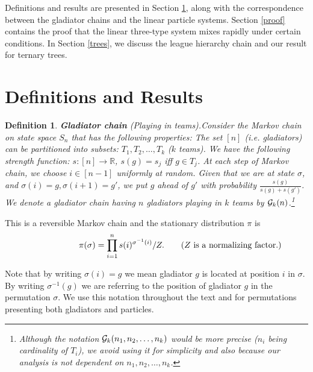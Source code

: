\documentclass[10 pt]{article}
\newcommand{\G}{{\cal G}}
\newcommand{\R}{\mathbb{R}}
\newtheorem{defin}{Definition}[section]
\begin{document}
\medskip
Definitions and results are presented in Section \ref{Section1}, along with the correspondence between the gladiator chains and the
linear particle systems. Section \ref{proof} contains the proof that the linear three-type system mixes rapidly under certain conditions.
In Section \ref{trees}, we discuss the league hierarchy chain and our result for ternary trees.  

\section{Definitions and Results}\label{Section1}



\begin{defin}\textbf{Gladiator chain} (Playing in teams).\label{defteams}
Consider the Markov chain  on state space $S_n$ that has the following properties: The set  $[n]$ (i.e. gladiators)  can be  partitioned
into subsets: $T_1 , T_2, \dots , T_k $ ($k$ teams). We have the following strength function: $s:[n]\rightarrow \R$, $s(g)=s_j$ iff $g\in T_j$.
At each step of Markov chain,  we choose $i\in [n{-}1]$ uniformly at random. Given that we are at state $\sigma$, and $\sigma(i)=g,
\sigma(i{+}1)=g'$, we put $g$ ahead of $g'$ with probability $\frac{s(g)}{s(g)+s(g')}$.  We denote a gladiator chain having $n$ gladiators
playing in $k$ teams by ${\G}_k(n)$.\footnote{Although the notation $\G_k(n_1,n_2,\dots,n_k)$ would be more precise ($n_i$ being cardinality
of $T_i$), we avoid using it for simplicity and also because our analysis is not dependent on $n_1, n_2, \dots, n_k$.}

\end{defin}


This is a reversible Markov chain and the stationary distribution $\pi$ is
\begin{equation}
\hspace{2 cm}\pi(\sigma)=\prod_{\substack{i=1}}^{n} s(i)^{\sigma^{-1}(i)}/Z.
\quad \quad(Z \text{ is a normalizing factor.})
\end{equation}\label{stationary}


Note that by writing $\sigma(i)=g$ we mean gladiator $g$ is located at position $i$ in $\sigma$. By writing 
$\sigma^{-1}(g)$ we are referring to the position of gladiator $g$ in the permutation $\sigma$. We use this notation throughout the text
and for permutations presenting both gladiators and particles. 
\end{document}
